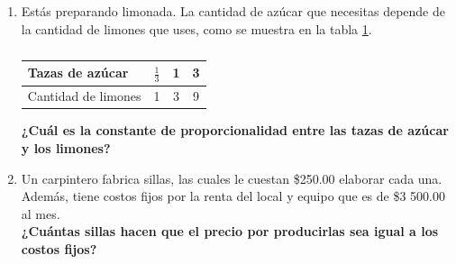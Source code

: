 \documentclass[11pt]{book}
\begin{document}
\begin{enumerate}
  \item Estás preparando limonada. La cantidad de azúcar que necesitas depende de la cantidad de limones que uses,
        como se muestra en la tabla \ref{tab:azucar_limon}.
        \begin{table}[!h]
          \centering
          \begin{tabular}{|l|c|c|c|}
            \hline
            Tazas de azúcar     & $\frac{1}{3}$ & 1 & 3 \\
            \hline
            Cantidad de limones & 1             & 3 & 9 \\
            \hline
          \end{tabular}
          \caption{}
          \label{tab:azucar_limon}
        \end{table}

        \textbf{¿Cuál es la constante de proporcionalidad entre las tazas de azúcar y los limones?}

  \item Un carpintero fabrica sillas, las cuales le cuestan \$250.00 elaborar cada una. Además, tiene costos fijos por la renta del local y equipo que es de \$3 500.00 al mes. \\
        \textbf{¿Cuántas sillas hacen que el precio por producirlas sea igual a los costos fijos?}\\


\end{enumerate}
\end{document}
